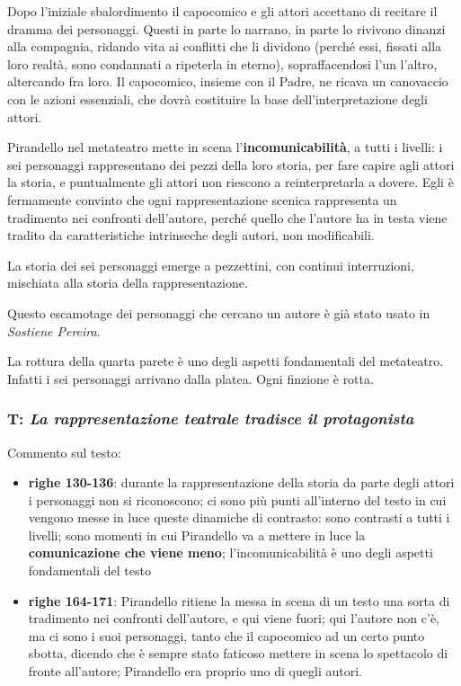\documentclass[a4paper, twoside, titlepage]{book}
\newcommand{\elenco}[1]{%
\begin{itemize}
#1
\end{itemize}}
\begin{document}
Dopo l'iniziale sbalordimento il capocomico e gli attori accettano di recitare il dramma dei personaggi. Questi in parte lo narrano, in parte lo rivivono dinanzi alla compagnia, ridando vita ai conflitti che li dividono (perché essi, fissati alla loro realtà, sono condannati a ripeterla in eterno), sopraffacendosi l'un l'altro, altercando fra loro. Il capocomico, insieme con il Padre, ne ricava un canovaccio con le azioni essenziali, che dovrà costituire la base dell'interpretazione degli attori.

Pirandello nel metateatro mette in scena l’\textbf{incomunicabilità}, a tutti i livelli: i sei personaggi rappresentano dei pezzi della loro storia, per fare capire agli attori la storia, e puntualmente gli attori non riescono a reinterpretarla a dovere.
Egli è fermamente convinto che ogni rappresentazione scenica rappresenta un tradimento nei confronti dell’autore, perché quello che l’autore ha in testa viene tradito da caratteristiche intrinseche degli autori, non modificabili.

La storia dei sei personaggi emerge a pezzettini, con continui interruzioni, mischiata alla storia della rappresentazione.

Questo escamotage dei personaggi che cercano un autore è già stato usato in \textit{Sostiene Pereira}.

La rottura della quarta parete è uno degli aspetti fondamentali del metateatro. Infatti i sei personaggi arrivano dalla platea. Ogni finzione è rotta.

\subsubsection{T: \textit{La rappresentazione teatrale tradisce il protagonista}}

Commento sul testo:
\elenco{\item \textbf{righe 130-136}: durante la rappresentazione della storia da parte degli attori i personaggi non si riconoscono; ci sono più punti all’interno del testo in cui vengono messe in luce queste dinamiche di contrasto: sono contrasti a tutti i livelli; sono momenti in cui Pirandello va a mettere in luce la \textbf{comunicazione che viene meno}; l’incomunicabilità è uno degli aspetti fondamentali del testo
\item \textbf{righe 164-171}: Pirandello ritiene la messa in scena di un testo una sorta di tradimento nei confronti dell’autore, e qui viene fuori; qui l’autore non c’è, ma ci sono i suoi personaggi, tanto che il capocomico ad un certo punto sbotta, dicendo che è sempre stato faticoso mettere in scena lo spettacolo di fronte all’autore; Pirandello era proprio uno di quegli autori.}
\end{document}
